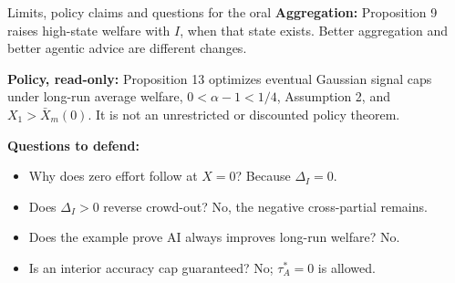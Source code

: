 \documentclass[11pt,aspectratio=169]{beamer}
\begin{document}
\begin{frame}{Limits, policy claims and questions for the oral}
\small
\textbf{Aggregation:} Proposition 9 raises high-state welfare with $I$, when that
state exists. Better aggregation and better agentic advice are different changes.
\medskip

\textbf{Policy, read-only:} Proposition 13 optimizes eventual Gaussian signal caps
under long-run average welfare, $0<\alpha-1<1/4$, Assumption 2,
and $X_1>\bar X_m(0)$. It is not an unrestricted or discounted policy theorem.
\medskip

\textbf{Questions to defend:}
\begin{itemize}
\item Why does zero effort follow at $X=0$? Because $\Delta_I=0$.
\item Does $\Delta_I>0$ reverse crowd-out? No, the negative cross-partial remains.
\item Does the example prove AI always improves long-run welfare? No.
\item Is an interior accuracy cap guaranteed? No; $\tau_A^*=0$ is allowed.
\end{itemize}
\end{frame}
\end{document}

